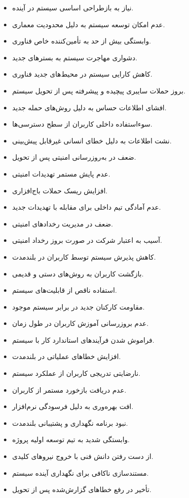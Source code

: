 \documentclass[12pt,a4paper]{report}
\begin{document}
\begin{itemize}
\item
نیاز به بازطراحی اساسی سیستم در آینده.
\item
عدم امکان توسعه سیستم به دلیل محدودیت معماری.
\item
وابستگی بیش از حد به تأمین‌کننده خاص فناوری.
\item
دشواری مهاجرت سیستم به بسترهای جدید.
\item
کاهش کارایی سیستم در محیط‌های جدید فناوری.
\item
بروز حملات سایبری پیچیده و پیشرفته پس از تحویل سیستم.
\item
افشای اطلاعات حساس به دلیل روش‌های حمله جدید.
\item
سوءاستفاده داخلی کاربران از سطح دسترسی‌ها.
\item
نشت اطلاعات به دلیل خطای انسانی غیرقابل پیش‌بینی.
\item
ضعف در به‌روزرسانی امنیتی پس از تحویل.
\item
عدم پایش مستمر تهدیدات امنیتی.
\item
افزایش ریسک حملات باج‌افزاری.
\item
عدم آمادگی تیم داخلی برای مقابله با تهدیدات جدید.
\item
ضعف در مدیریت رخدادهای امنیتی.
\item
آسیب به اعتبار شرکت در صورت بروز رخداد امنیتی.
\item
کاهش پذیرش سیستم توسط کاربران در بلندمدت.
\item
بازگشت کاربران به روش‌های دستی و قدیمی.
\item
استفاده ناقص از قابلیت‌های سیستم.
\item
مقاومت کارکنان جدید در برابر سیستم موجود.
\item
عدم بروزرسانی آموزش کاربران در طول زمان.
\item
فراموش شدن فرآیندهای استاندارد کار با سیستم.
\item
افزایش خطاهای عملیاتی در بلندمدت.
\item
نارضایتی تدریجی کاربران از عملکرد سیستم.
\item
عدم دریافت بازخورد مستمر از کاربران.
\item
افت بهره‌وری به دلیل فرسودگی نرم‌افزار.
\item
نبود برنامه نگهداری و پشتیبانی بلندمدت.
\item
وابستگی شدید به تیم توسعه اولیه پروژه.
\item
از دست رفتن دانش فنی با خروج نیروهای کلیدی.
\item
مستندسازی ناکافی برای نگهداری آینده سیستم.
\item
تأخیر در رفع خطاهای گزارش‌شده پس از تحویل.

\end{itemize}
\end{document}

